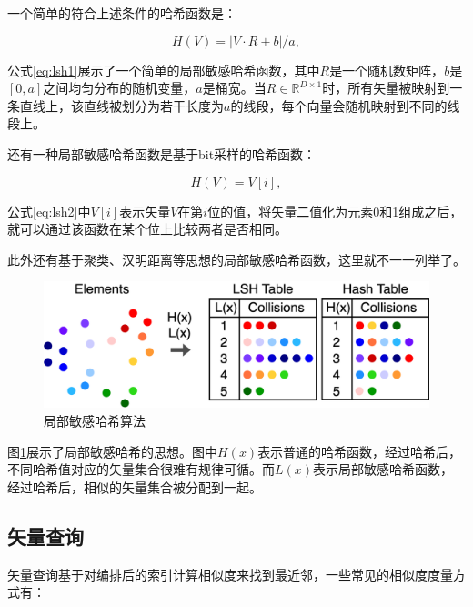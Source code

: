 一个简单的符合上述条件的哈希函数是：

\begin{equation}
    H(V)=|V\cdot R+b|/a,
    \label{eq:lsh1}
\end{equation}

公式\ref{eq:lsh1}展示了一个简单的局部敏感哈希函数，其中$R$是一个随机数矩阵，$b$是$[0,a]$之间均匀分布的随机变量，$a$是桶宽。当$R\in\mathbb{R}^{D\times 1}$时，所有矢量被映射到一条直线上，该直线被划分为若干长度为$a$的线段，每个向量会随机映射到不同的线段上。

还有一种局部敏感哈希函数是基于bit采样的哈希函数：

\begin{equation}
    H(V)=V[i],
    \label{eq:lsh2}
\end{equation}

公式\ref{eq:lsh2}中$V[i]$表示矢量$V$在第$i$位的值，将矢量二值化为元素0和1组成之后，就可以通过该函数在某个位上比较两者是否相同。

此外还有基于聚类、汉明距离等思想的局部敏感哈希函数，这里就不一一列举了。

\begin{figure}[H]
    \includegraphics[width=\textwidth]{examples/lsh.png}
    \caption{局部敏感哈希算法}
    \label{fig:lsh}
\end{figure}

图\ref{fig:lsh}展示了局部敏感哈希的思想。图中$H(x)$表示普通的哈希函数，经过哈希后，不同哈希值对应的矢量集合很难有规律可循。而$L(x)$表示局部敏感哈希函数，经过哈希后，相似的矢量集合被分配到一起。

\subsection{矢量查询}

矢量查询基于对编排后的索引计算相似度来找到最近邻，一些常见的相似度度量方式有：


